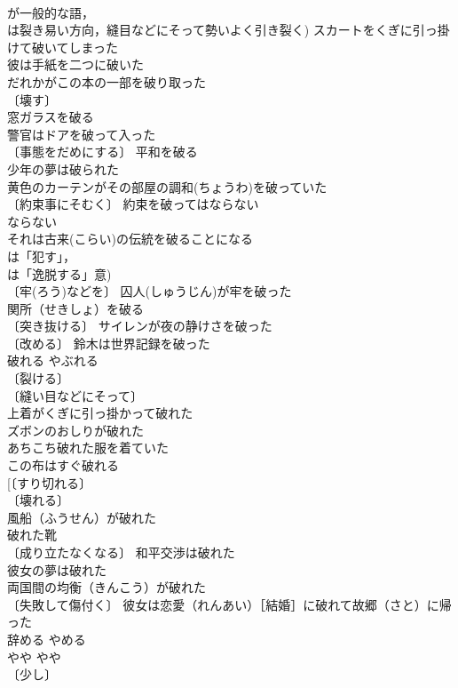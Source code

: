 \documentclass[8pt]{extreport}
\begin{document}
\begin{CJK}{UTF8}{min}
\\	が一般的な語，
\\	は裂き易い方向，縫目などにそって勢いよく引き裂く) スカートをくぎに引っ掛けて破いてしまった 
\\	彼は手紙を二つに破いた 
\\	だれかがこの本の一部を破り取った 
\\	〔壊す〕
\\	窓ガラスを破る 
\\	警官はドアを破って入った 
\\	〔事態をだめにする〕 平和を破る 
\\	少年の夢は破られた 
\\	黄色のカーテンがその部屋の調和(ちょうわ)を破っていた 
\\	〔約束事にそむく〕 約束を破ってはならない 
\\	ならない　
\\	それは古来(こらい)の伝統を破ることになる 
\\	は「犯す」，
\\	は「逸脱する」意) 
\\	〔牢(ろう)などを〕 囚人(しゅうじん)が牢を破った 
\\	関所（せきしょ）を破る 
\\	〔突き抜ける〕 サイレンが夜の静けさを破った 
\\	〔改める〕 鈴木は世界記録を破った 
\\	破れる	やぶれる	
\\	〔裂ける〕
\\	〔縫い目などにそって〕
\\	上着がくぎに引っ掛かって破れた 
\\	ズボンのおしりが破れた 
\\	あちこち破れた服を着ていた 
\\	この布はすぐ破れる 
\\	[〔すり切れる〕 
\\	〔壊れる〕
\\	風船（ふうせん）が破れた 
\\	破れた靴 
\\	〔成り立たなくなる〕 和平交渉は破れた 
\\	彼女の夢は破れた 
\\	両国間の均衡（きんこう）が破れた 
\\	〔失敗して傷付く〕 彼女は恋愛（れんあい）［結婚］に破れて故郷（さと）に帰った 
\\	辞める	やめる	
\\	やや	やや	
\\	〔少し〕

\end{CJK}
\end{document}
